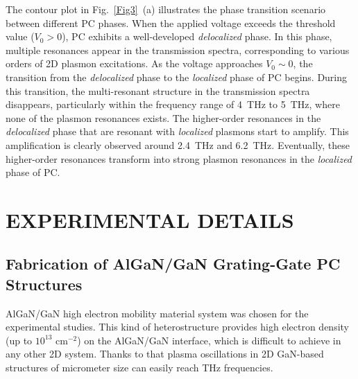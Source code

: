 \documentclass[%
 reprint,
 amsmath,amssymb,
 aps,
]{revtex4-2}
\begin{document}
The contour plot in Fig.~\ref{Fig3}~(a) illustrates the phase transition scenario between different PC phases. When the applied voltage exceeds the threshold value ($V_0 > 0$), PC exhibits a well-developed \textit{delocalized} phase. In this phase, multiple resonances appear in the transmission spectra, corresponding to various orders of 2D plasmon excitations.
As the voltage approaches $V_0 \sim 0$, the transition from the \textit{delocalized} phase to the \textit{localized} phase of PC begins. During this transition, the multi-resonant structure in the transmission spectra disappears, particularly within the frequency range of 4~THz to 5~THz, where none of the plasmon resonances exists.
The higher-order resonances in the \textit{delocalized} phase that are resonant with \textit{localized} plasmons start to amplify. This amplification is clearly observed around 2.4~THz and 6.2~THz. Eventually, these higher-order resonances transform into strong plasmon resonances in the \textit{localized} phase of PC.


\section{EXPERIMENTAL DETAILS}\label{Sec3}
\subsection{Fabrication of AlGaN/GaN Grating-Gate PC Structures}

AlGaN/GaN high electron mobility material system was chosen for the experimental studies. This kind of heterostructure provides high electron density (up to $10^{13}$ cm$^{-2}$) on the AlGaN/GaN interface, which is difficult to achieve in any other 2D system. 
Thanks to that plasma oscillations in 2D GaN-based structures of micrometer size can easily reach THz frequencies.
\end{document}
